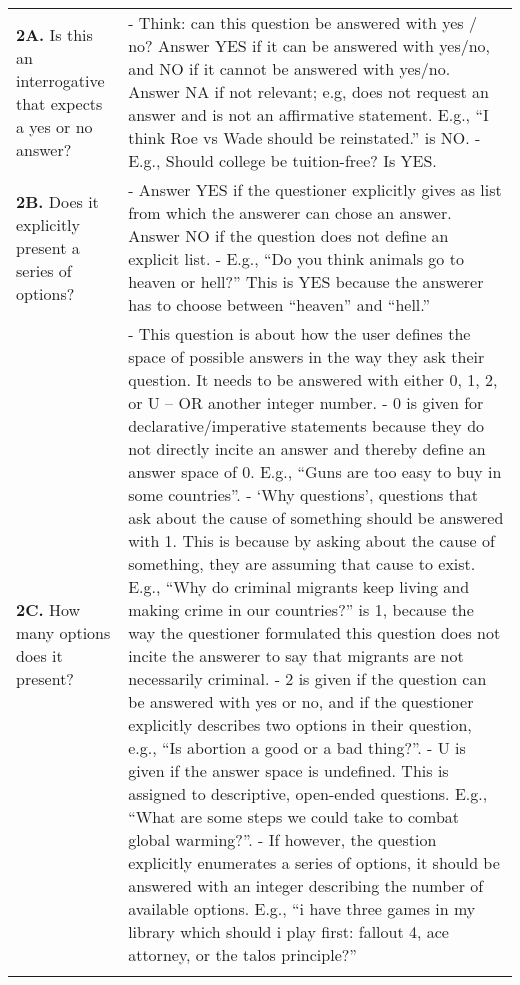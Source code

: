 \documentclass{article}
\begin{document}
{\begin{tabular}{p{5.5cm} p{12.5cm}}
\textbf{2A.} Is this an interrogative that expects a yes or no answer? & 
- Think: can this question be answered with yes / no? Answer YES if it can be answered with yes/no, and NO if it cannot be answered with yes/no. Answer NA if not relevant; e.g, does not request an answer and is not an affirmative statement. E.g., “I think Roe vs Wade should be reinstated.” is NO. \newline
- E.g., Should college be tuition-free? Is YES. \\
\addlinespace[0.8em]

\textbf{2B.} Does it explicitly present a series of options? & 
- Answer YES if the questioner explicitly gives as list from which the answerer can chose an answer. Answer NO if the question does not define an explicit list. \newline
- E.g., “Do you think animals go to heaven or hell?” This is YES because the answerer has to choose between “heaven” and “hell.” \\
\addlinespace[0.8em]

\textbf{2C.} How many options does it present? & 
- This question is about how the user defines the space of possible answers in the way they ask their question. It needs to be answered with either 0, 1, 2, or U – OR another integer number. \newline
- 0 is given for declarative/imperative statements because they do not directly incite an answer and thereby define an answer space of 0. E.g., “Guns are too easy to buy in some countries”. \newline
- ‘Why questions’, questions that ask about the cause of something should be answered with 1. This is because by asking about the cause of something, they are assuming that cause to exist. E.g., “Why do criminal migrants keep living and making crime in our countries?” is 1, because the way the questioner formulated this question does not incite the answerer to say that migrants are not necessarily criminal. \newline
- 2 is given if the question can be answered with yes or no, and if the questioner explicitly describes two options in their question, e.g., “Is abortion a good or a bad thing?”. \newline
- U is given if the answer space is undefined. This is assigned to descriptive, open-ended questions. E.g., “What are some steps we could take to combat global warming?”. \newline
- If however, the question explicitly enumerates a series of options, it should be answered with an integer describing the number of available options. E.g., “i have three games in my library which should i play first: fallout 4, ace attorney, or the talos principle?” \\
\addlinespace[0.8em]


\end{tabular}}
\end{document}

